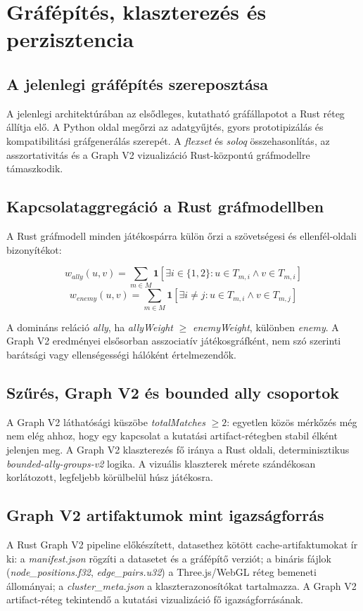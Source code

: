 \chapter{Gráfépítés, klaszterezés és perzisztencia}

\section{A jelenlegi gráfépítés szereposztása}

A jelenlegi architektúrában az elsődleges, kutatható gráfállapotot a Rust réteg állítja elő. A Python oldal megőrzi az adatgyűjtés, gyors prototipizálás és kompatibilitási gráfgenerálás szerepét. A \textit{flexset} és \textit{soloq} összehasonlítás, az asszortativitás és a Graph V2 vizualizáció Rust-központú gráfmodellre támaszkodik.

\section{Kapcsolataggregáció a Rust gráfmodellben}

A Rust gráfmodell minden játékospárra külön őrzi a szövetségesi és ellenfél-oldali bizonyítékot:

\begin{equation}
w_{ally}(u,v)=\sum_{m \in M}\mathbf{1}[\exists i \in \{1,2\}: u \in T_{m,i} \land v \in T_{m,i}]
\end{equation}
\begin{equation}
w_{enemy}(u,v)=\sum_{m \in M}\mathbf{1}[\exists i \neq j: u \in T_{m,i} \land v \in T_{m,j}]
\end{equation}

A domináns reláció \textit{ally}, ha \textit{allyWeight} $\geq$ \textit{enemyWeight}, különben \textit{enemy}. A Graph V2 eredményei elsősorban asszociatív játékosgráfként, nem szó szerinti barátsági vagy ellenségességi hálóként értelmezendők.

\section{Szűrés, Graph V2 és bounded ally csoportok}

A Graph V2 láthatósági küszöbe \textit{totalMatches} $\geq 2$: egyetlen közös mérkőzés még nem elég ahhoz, hogy egy kapcsolat a kutatási artifact-rétegben stabil élként jelenjen meg. A Graph V2 klaszterezés fő iránya a Rust oldali, determinisztikus \textit{bounded-ally-groups-v2} logika. A vizuális klaszterek mérete szándékosan korlátozott, legfeljebb körülbelül húsz játékosra.

\section{Graph V2 artifaktumok mint igazságforrás}

A Rust Graph V2 pipeline előkészített, datasethez kötött cache-artifaktumokat ír ki: a \textit{manifest.json} rögzíti a datasetet és a gráfépítő verziót; a bináris fájlok (\textit{node\_positions.f32}, \textit{edge\_pairs.u32}) a Three.js/WebGL réteg bemeneti állományai; a \textit{cluster\_meta.json} a klaszterazonosítókat tartalmazza. A Graph V2 artifact-réteg tekintendő a kutatási vizualizáció fő igazságforrásának.
